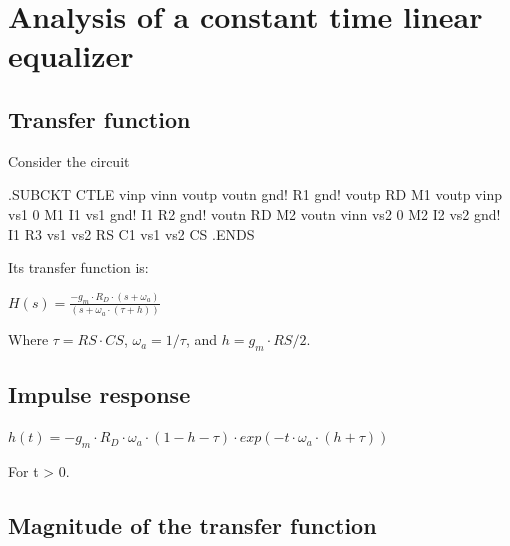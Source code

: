 \documentclass{article}
\begin{document}
\section{Analysis of a constant time linear equalizer}

\subsection{Transfer function}

Consider the circuit

\begin{file}

.SUBCKT CTLE vinp vinn voutp voutn gnd! \newline
R1 gnd! voutp RD						\newline
M1 voutp vinp vs1 0 M1					\newline
I1 vs1 gnd! I1							\newline
R2 gnd! voutn RD						\newline
M2 voutn vinn vs2 0 M2					\newline
I2 vs2 gnd! I1							\newline
R3 vs1 vs2 RS							\newline
C1 vs1 vs2 CS							\newline
.ENDS
\end{file}

Its transfer function is:

\begin{question}
	\centerline{$ H(s) = \frac{-g_m \cdot R_D \cdot (s + \omega_a)}{(s + \omega_a \cdot (\tau + h))}
		$}
\end{question}

Where $\tau = RS \cdot CS$, $\omega_a = 1/\tau$, and $h = g_m \cdot RS / 2$.

\subsection{Impulse response}

\begin{question}
	\centerline{$ h(t) = -g_m \cdot R_D \cdot \omega_a \cdot (1 - h - \tau) \cdot exp(-t \cdot \omega_a \cdot (h + \tau) )
		$}
\end{question}

For t > 0.

\subsection{Magnitude of the transfer function}
\end{document}
